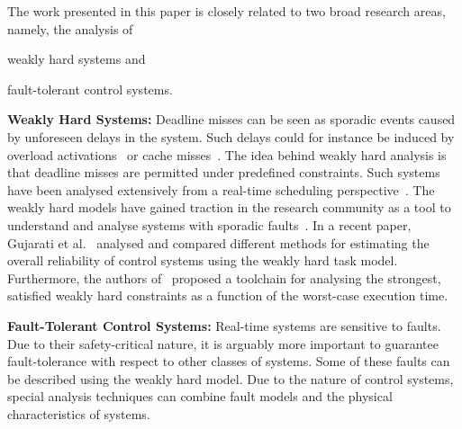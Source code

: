 The work presented in this paper is closely related to two broad research areas, namely, the analysis of 
\begin{enumerate*}[label=(\roman*)]
    \item weakly hard systems and
    \item fault-tolerant control systems.
\end{enumerate*}

\textbf{Weakly Hard Systems:}
Deadline misses can be seen as sporadic events caused by unforeseen delays in the system.
Such delays could for instance be induced by overload activations~\cite{Xu:2015, Ernst:2014} or cache misses~\cite{Altmeyer:2014, Davis:2013}.
The idea behind weakly hard analysis is that deadline misses are permitted under predefined constraints.
Such systems have been analysed extensively from a real-time scheduling perspective~\cite{Bernat:1997, Caccamo:1997, Choi:2019, Hammadeh:2019}.
The weakly hard models have gained traction in the research community as a tool to understand and analyse systems with sporadic faults~\cite{Soudbakhsh:2013, Bund:2014, Frehse:2014, Bund:2015, Hammadeh:2017a, Hammadeh:2017b, Sun:2017, Ahrendts:2018, Soudbakhsh:2018, Pazzaglia:2018, Gaukler:2019a}.
In a recent paper, Gujarati et al.~\cite{Gujarati:2019} analysed and compared different methods for estimating the overall reliability of control systems using the weakly hard task model.
Furthermore, the authors of~\cite{Broman:2019} proposed a toolchain for analysing the strongest, satisfied weakly hard constraints as a function of the worst-case execution time.

\textbf{Fault-Tolerant Control Systems:} 
Real-time systems are sensitive to faults.
Due to their safety-critical nature, it is arguably more important to guarantee fault-tolerance with respect to other classes of systems.
Some of these faults can be described using the weakly hard model.
Due to the nature of control systems, special analysis techniques can combine fault models and the physical characteristics of systems.

